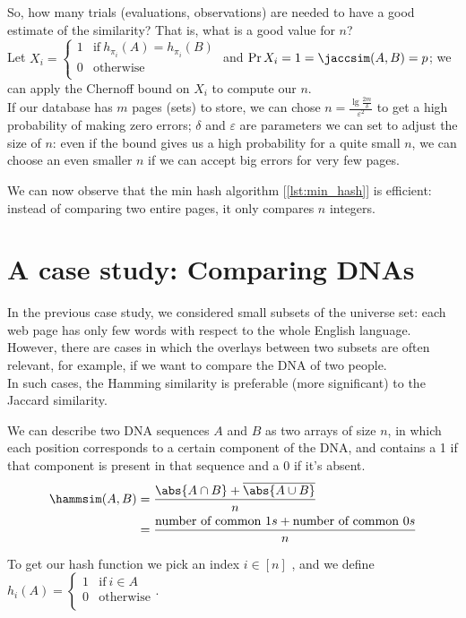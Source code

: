 So, how many trials (evaluations, observations) are needed to have a good estimate of the similarity? That is, what is a good value for $n$?\\
Let $
	X_i=\begin{cases}
	1 & \text{if}\ h_{\pi_i}(A)=h_{\pi_i}(B)\\
	0 & \text{otherwise}\\
	\end{cases} $
and $\Pr{X_i=1} = \jaccsim(A,B)=p$; we can apply the Chernoff bound on $X_i$ to compute our $n$.\\
If our database has $m$ pages (sets) to store, we can chose $\displaystyle n = \frac{\lg{\frac{2m}{\delta}}}{\varepsilon^2}$ to get a high probability of making zero errors; $\delta$ and $\varepsilon$ are parameters we can set to adjust the size of $n$: even if the bound gives us a high probability for a quite small $n$, we can choose an even smaller $n$ if we can accept big errors for very few pages.

We can now observe that the min hash algorithm [\ref{lst:min_hash}] is efficient: instead of comparing two entire pages, it only compares $n$ integers.

\section{A case study: Comparing DNAs}

In the previous case study, we considered small subsets of the universe set: each web page has only few words with respect to the whole English language.\\
However, there are cases in which the overlays between two subsets are often relevant, for example, if we want to compare the DNA of two people.\\
In such cases, the Hamming similarity is preferable (more significant) to the Jaccard similarity.

We can describe two DNA sequences $A$ and $B$ as two arrays of size $n$, in which each position corresponds to a certain component of the DNA, and contains a 1 if that component is present in that sequence and a 0 if it's absent.
\begin{align*}
	\hammsim(A,B) &=
	\frac{\abs{A \cap B} + \overline{\abs{A \cup B}}}{n}\\
	&= \frac{\text{number of common } 1s + \text{number of common } 0s}{n}
\end{align*}

To get our hash function we pick an index $i\in[n]$ \uar, and we define\\
$ h_i(A)=\begin{cases}
	1 & \text{if}\ i \in A\\
	0 & \text{otherwise}\\
\end{cases} $. \label{hamming_hash}

